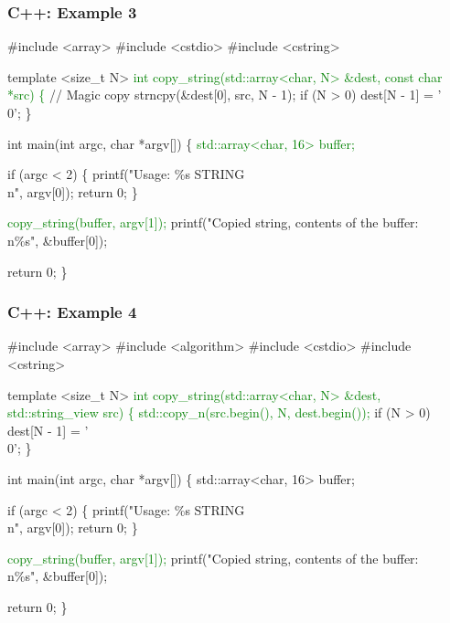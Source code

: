 \documentclass[usenames,dvipsnames]{beamer}
\newcommand{\greenalert}[1] {\alert{\textcolor{green}{#1}}}
\begin{document}
\begin{frame}[fragile]
\frametitle{C++: Example 3}
\tiny
\begin{semiverbatim}
\#include <array>
\#include <cstdio>
\#include <cstring>

template <size\_t N>
\greenalert{int copy\_string(std::array<char, N> &dest, const char *src) \{}
  // Magic copy 
  strncpy(&dest[0], src, N - 1);
  if (N > 0)
    dest[N - 1] = '\\0';
\}

int main(int argc, char *argv[]) \{
  \greenalert{std::array<char, 16> buffer;}

  if (argc < 2) \{
    printf("Usage: \%s STRING\\n", argv[0]);
    return 0;
  \}

  \greenalert{copy\_string(buffer, argv[1]);}
  printf("Copied string, contents of the buffer:\\n\%s", &buffer[0]);

  return 0;
\}
\end{semiverbatim}
\end{frame}

\begin{frame}
\frametitle{C++: Example 4}
\tiny
\begin{semiverbatim}
\#include <array>
\#include <algorithm>
\#include <cstdio>
\#include <cstring>

template <size\_t N>
\greenalert{int copy\_string(std::array<char, N> \&dest, std::string\_view src) \{}
  \greenalert{std::copy\_n(src.begin(), N, dest.begin());}
  if (N > 0)
    dest[N - 1] = '\\0';
\}

int main(int argc, char *argv[]) \{
  std::array<char, 16> buffer;

  if (argc < 2) \{
    printf("Usage: \%s STRING\\n", argv[0]);
    return 0;
  \}

  \greenalert{copy\_string(buffer, argv[1]);}
  printf("Copied string, contents of the buffer:\\n\%s", \&buffer[0]);

  return 0;
\}
\end{semiverbatim}
\end{frame}
\end{document}
